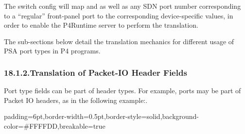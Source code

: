 \documentclass[11pt]{article}
\begin{document}
{%
\noindent{}The switch config will map  and  \textemdash{} as well
as any SDN port number corresponding to a \textquotedblleft{}regular\textquotedblright{} front-panel port \textemdash{} to the
corresponding device-specific values, in order to enable the P4Runtime server to
perform the translation.%

The sub-sections below detail the translation mechanics for different usage of
PSA port types in P4 programs.%

\subsubsection{18.1.2.\hspace*{0.5em}Translation of Packet-IO Header Fields}\label{sec-translation-of-packet-io-header-fields}%

\noindent{}Port type fields can be part of header types. For example, ports may be part of
Packet IO headers, as in the following example:.%

\begin{mdbmargintb}{6pt}{6pt}%
\begin{mdblock}{padding=6pt,border-width=0.5pt,border-style=solid,background-color=\#FFFFDD,breakable=true}%
\begin{mdpre}%
\end{mdpre}%
\end{mdblock}%
\end{mdbmargintb}%

}
\end{document}
